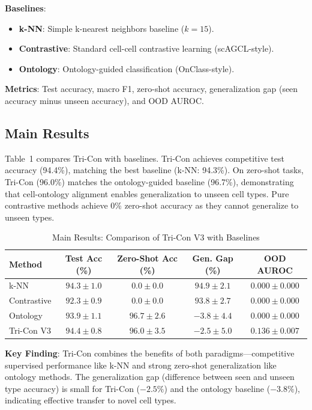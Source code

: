 \documentclass[11pt]{article}
\begin{document}
\textbf{Baselines}:
\begin{itemize}
    \item \textbf{k-NN}: Simple k-nearest neighbors baseline ($k=15$).
    \item \textbf{Contrastive}: Standard cell-cell contrastive learning (scAGCL-style).
    \item \textbf{Ontology}: Ontology-guided classification (OnClass-style).
\end{itemize}

\textbf{Metrics}: Test accuracy, macro F1, zero-shot accuracy, generalization gap (seen accuracy minus unseen accuracy), and OOD AUROC.

\subsection{Main Results}

Table~1 compares Tri-Con with baselines. Tri-Con achieves competitive test accuracy (94.4\%), matching the best baseline (k-NN: 94.3\%). On zero-shot tasks, Tri-Con (96.0\%) matches the ontology-guided baseline (96.7\%), demonstrating that cell-ontology alignment enables generalization to unseen cell types. Pure contrastive methods achieve 0\% zero-shot accuracy as they cannot generalize to unseen types.

\begin{table}[t]
\centering
\caption{Main Results: Comparison of Tri-Con V3 with Baselines}
\label{tab:main_results}
\begin{tabular}{lcccc}
\toprule
Method & Test Acc (\%) & Zero-Shot Acc (\%) & Gen. Gap (\%) & OOD AUROC \\
\midrule
k-NN & $94.3 \pm 1.0$ & $0.0 \pm 0.0$ & $94.9 \pm 2.1$ & $0.000 \pm 0.000$ \\
Contrastive & $92.3 \pm 0.9$ & $0.0 \pm 0.0$ & $93.8 \pm 2.7$ & $0.000 \pm 0.000$ \\
Ontology & $93.9 \pm 1.1$ & $96.7 \pm 2.6$ & $-3.8 \pm 4.4$ & $0.000 \pm 0.000$ \\
Tri-Con V3 & $94.4 \pm 0.8$ & $96.0 \pm 3.5$ & $-2.5 \pm 5.0$ & $0.136 \pm 0.007$ \\
\bottomrule
\end{tabular}
\end{table}

\textbf{Key Finding}: Tri-Con combines the benefits of both paradigms---competitive supervised performance like k-NN and strong zero-shot generalization like ontology methods. The generalization gap (difference between seen and unseen type accuracy) is small for Tri-Con ($-2.5\%$) and the ontology baseline ($-3.8\%$), indicating effective transfer to novel cell types.
\end{document}
